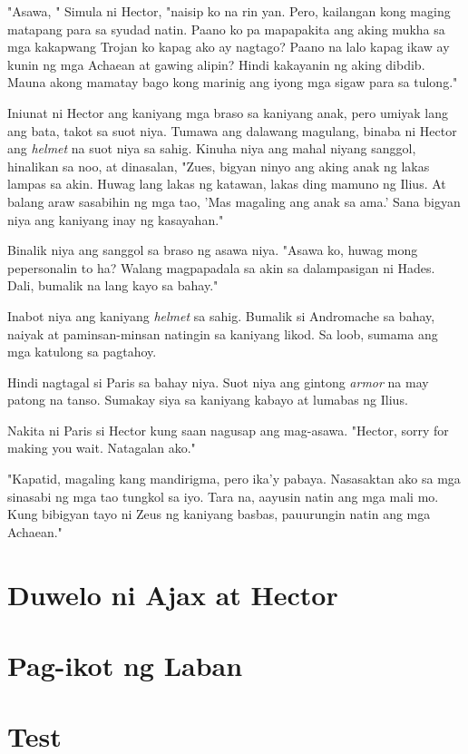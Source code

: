 \documentclass[12pt,letterpaper]{report}
\begin{document}
"Asawa, " Simula ni Hector, "naisip ko na rin yan. Pero, kailangan kong maging matapang para sa syudad natin. Paano ko pa mapapakita ang aking mukha sa mga kakapwang Trojan ko kapag ako ay nagtago? Paano na lalo kapag ikaw ay kunin ng mga Achaean at gawing alipin? Hindi kakayanin ng aking dibdib. Mauna akong mamatay bago kong marinig ang iyong mga sigaw para sa tulong."

Iniunat ni Hector ang kaniyang mga braso sa kaniyang anak, pero umiyak lang ang bata, takot sa suot niya. Tumawa ang dalawang magulang, binaba ni Hector ang \textit{helmet} na suot niya sa sahig. Kinuha niya ang mahal niyang sanggol, hinalikan sa noo, at dinasalan, "Zues, bigyan ninyo ang aking anak ng lakas lampas sa akin. Huwag lang lakas ng katawan, lakas ding mamuno ng Ilius. At balang araw sasabihin ng mga tao, 'Mas magaling ang anak sa ama.' Sana bigyan niya ang kaniyang inay ng kasayahan."

Binalik niya ang sanggol sa braso ng asawa niya. "Asawa ko, huwag mong pepersonalin to ha? Walang magpapadala sa akin sa dalampasigan ni Hades. Dali, bumalik na lang kayo sa bahay."

Inabot niya ang kaniyang \textit{helmet} sa sahig. Bumalik si Andromache sa bahay, naiyak at paminsan-minsan natingin sa kaniyang likod. Sa loob, sumama ang mga katulong sa pagtahoy.

Hindi nagtagal si Paris sa bahay niya. Suot niya ang gintong \textit{armor} na may patong na tanso. Sumakay siya sa kaniyang kabayo at lumabas ng Ilius.

Nakita ni Paris si Hector kung saan nagusap ang mag-asawa. "Hector, sorry for making you wait. Natagalan ako."

"Kapatid, magaling kang mandirigma, pero ika'y pabaya. Nasasaktan ako sa mga sinasabi ng mga tao tungkol sa iyo. Tara na, aayusin natin ang mga mali mo. Kung bibigyan tayo ni Zeus ng kaniyang basbas, pauurungin natin ang mga Achaean."

\pagebreak
\chapter{Duwelo ni Ajax at Hector}
\pagebreak
\chapter{Pag-ikot ng Laban}
\pagebreak
\chapter{Test}
\end{document}
